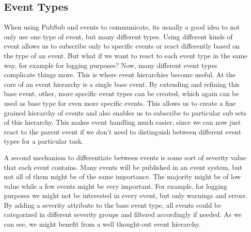 \subsection{Event Types}

When using PubSub and events to communicate, its usually a good idea to not only use one type of event, but many different types.
Using different kinds of event allows us to subscribe only to specific events or react differently based on the type of an event.
But what if we want to react to each event type in the same way, for example for logging purposes?
Now, many different event types complicate things more.
This is where event hierarchies become useful.
At the core of an event hierarchy is a single base event.
By extending and refining this base event, other, more specific event types can be created, which again can be used as base type for even more specific events.
This allows us to create a fine grained hierarchy of events and also enables us to subscribe to particular sub sets of this hierarchy.
This makes event handling much easier, since we can now just react to the parent event if we don't need to distinguish between different event types for a particular task.

A second mechanism to differentiate between events is some sort of severity value that each event contains.
Many events will be published in an event system, but not all of them might be of the same importance.
The majority might be of low value while a few events might be very important.
For example, for logging purposes we might not be interested in every event, but only warnings and errors.
By adding a severity attribute to the base event type, all events could be categorized in different severity groups and filtered accordingly if needed.
As we can see, we might benefit from a well thought-out event hierarchy.

